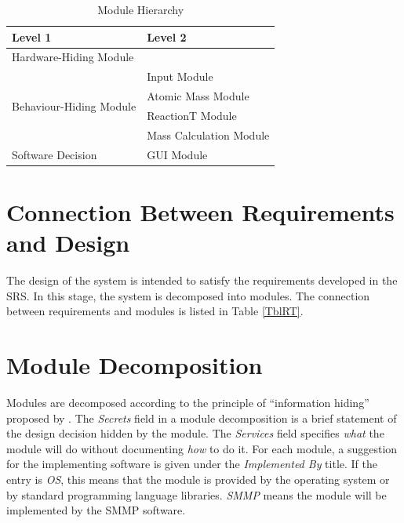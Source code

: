 \documentclass[12pt, titlepage]{article}
\begin{document}
\begin{table}[h!]
\centering
\begin{tabular}{p{} p{}}
\toprule
\textbf{Level 1} & \textbf{Level 2}\\
\midrule

{Hardware-Hiding Module} & ~ \\
\midrule

\multirow{4}{0.3\textwidth}{Behaviour-Hiding Module} &Input Module \\
& Atomic Mass Module\\
&ReactionT Module \\
& Mass Calculation Module\\

\midrule

\multirow{1}{0.3\textwidth}{Software Decision} &  GUI Module\\

\bottomrule

\end{tabular}
\caption{Module Hierarchy}
\label{TblMH}
\end{table}


\section{Connection Between Requirements and Design} \label{SecConnection}

The design of the system is intended to satisfy the requirements developed in
the SRS. In this stage, the system is decomposed into modules. The connection
between requirements and modules is listed in Table \ref{TblRT}.


\section{Module Decomposition} \label{SecMD}

Modules are decomposed according to the principle of ``information hiding''
proposed by \cite{Parnas:EAll:1984}. The \emph{Secrets} field in a module
decomposition is a brief statement of the design decision hidden by the
module. The \emph{Services} field specifies \emph{what} the module will do
without documenting \emph{how} to do it. For each module, a suggestion for the
implementing software is given under the \emph{Implemented By} title. If the
entry is \emph{OS}, this means that the module is provided by the operating
system or by standard programming language libraries.  \emph{SMMP} means the
module will be implemented by the SMMP software.
\end{document}
